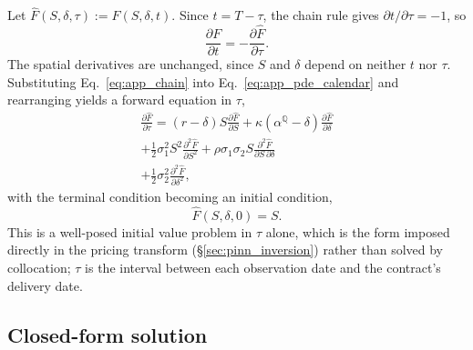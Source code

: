 \documentclass[sigconf, authorversion=true, nonacm=true]{acmart}
\newcommand{\convyield}{\delta}             %
\newcommand{\meanrev}{\kappa}               %
\newcommand{\longrun}{\alpha}               %
\begin{document}
Let $\hat{F}(S, \convyield, \tau) := F(S, \convyield, t)$. Since $t = T - \tau$, the chain rule gives $\partial t/\partial \tau = -1$, so
\begin{equation}
  \label{eq:app_chain}
  \frac{\partial F}{\partial t} = -\frac{\partial \hat{F}}{\partial \tau}.
\end{equation}
\noindent
The spatial derivatives are unchanged, since $S$ and $\convyield$ depend on neither $t$ nor $\tau$. Substituting Eq.~\ref{eq:app_chain} into Eq.~\ref{eq:app_pde_calendar} and rearranging yields a forward equation in $\tau$,
\begin{equation}
  \label{eq:app_pde_tau}
  \begin{multlined}
  \frac{\partial \hat{F}}{\partial \tau}
  = (r - \convyield)S\frac{\partial \hat{F}}{\partial S}
  + \meanrev(\longrun^{\mathbb{Q}} - \convyield)\frac{\partial \hat{F}}{\partial \convyield} \\
  + \frac{1}{2}\sigma_1^2 S^2\frac{\partial^2 \hat{F}}{\partial S^2}
  + \rho\sigma_1\sigma_2 S\frac{\partial^2 \hat{F}}{\partial S\,\partial \convyield} \\
  + \frac{1}{2}\sigma_2^2\frac{\partial^2 \hat{F}}{\partial \convyield^2},
  \end{multlined}
\end{equation}
\noindent
with the terminal condition becoming an initial condition,
\begin{equation}
  \label{eq:app_ic}
  \hat{F}(S, \convyield, 0) = S.
\end{equation}
\noindent
This is a well-posed initial value problem in $\tau$ alone, which is the form imposed directly in the pricing transform (\S\ref{sec:pinn_inversion}) rather than solved by collocation; $\tau$ is the interval between each observation date and the contract's delivery date.

\subsection{Closed-form solution}
\end{document}
